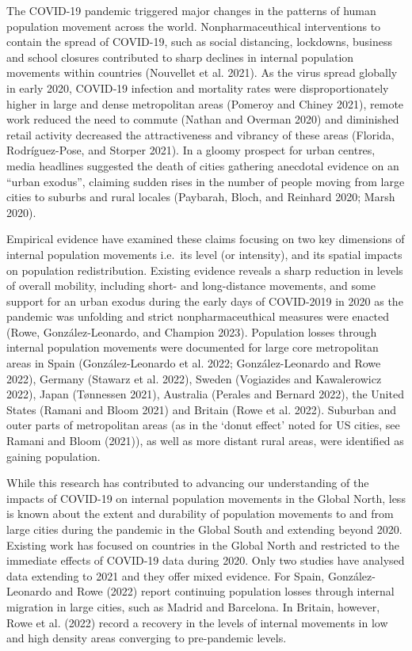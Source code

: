 \documentclass[
  11pt,
]{article}
\begin{document}
The COVID-19 pandemic triggered major changes in the patterns of human
population movement across the world. Nonpharmaceuthical interventions
to contain the spread of COVID-19, such as social distancing, lockdowns,
business and school closures contributed to sharp declines in internal
population movements within countries (Nouvellet et al. 2021). As the
virus spread globally in early 2020, COVID‐19 infection and mortality
rates were disproportionately higher in large and dense metropolitan
areas (Pomeroy and Chiney 2021), remote work reduced the need to commute
(Nathan and Overman 2020) and diminished retail activity decreased the
attractiveness and vibrancy of these areas (Florida, Rodríguez-Pose, and
Storper 2021). In a gloomy prospect for urban centres, media headlines
suggested the death of cities gathering anecdotal evidence on an ``urban
exodus'', claiming sudden rises in the number of people moving from
large cities to suburbs and rural locales (Paybarah, Bloch, and Reinhard
2020; Marsh 2020).

Empirical evidence have examined these claims focusing on two key
dimensions of internal population movements i.e.~its level (or
intensity), and its spatial impacts on population redistribution.
Existing evidence reveals a sharp reduction in levels of overall
mobility, including short- and long-distance movements, and some support
for an urban exodus during the early days of COVID-2019 in 2020 as the
pandemic was unfolding and strict nonpharmaceuthical measures were
enacted (Rowe, González-Leonardo, and Champion 2023). Population losses
through internal population movements were documented for large core
metropolitan areas in Spain (González-Leonardo et al. 2022;
González-Leonardo and Rowe 2022), Germany (Stawarz et al. 2022), Sweden
(Vogiazides and Kawalerowicz 2022), Japan (Tønnessen 2021), Australia
(Perales and Bernard 2022), the United States (Ramani and Bloom 2021)
and Britain (Rowe et al. 2022). Suburban and outer parts of metropolitan
areas (as in the `donut effect' noted for US cities, see Ramani and
Bloom (2021)), as well as more distant rural areas, were identified as
gaining population.

While this research has contributed to advancing our understanding of
the impacts of COVID-19 on internal population movements in the Global
North, less is known about the extent and durability of population
movements to and from large cities during the pandemic in the Global
South and extending beyond 2020. Existing work has focused on countries
in the Global North and restricted to the immediate effects of COVID-19
data during 2020. Only two studies have analysed data extending to 2021
and they offer mixed evidence. For Spain, González-Leonardo and Rowe
(2022) report continuing population losses through internal migration in
large cities, such as Madrid and Barcelona. In Britain, however, Rowe et
al. (2022) record a recovery in the levels of internal movements in low
and high density areas converging to pre-pandemic levels.
\end{document}
